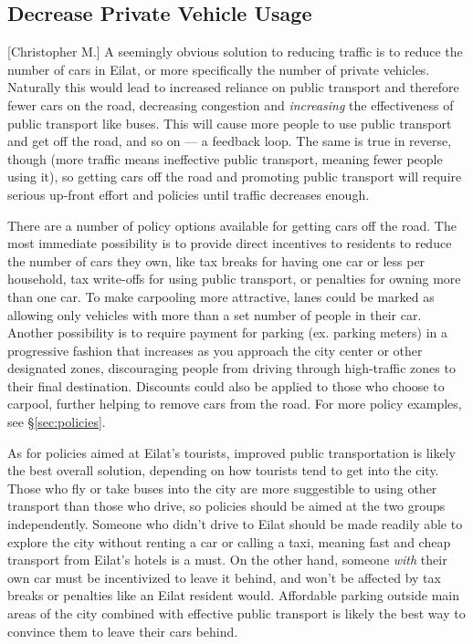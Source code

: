 \documentclass[12pt]{article}                       %
\begin{document}
\subsection{Decrease Private Vehicle Usage}[Christopher M.]
A seemingly obvious solution to reducing traffic is to reduce the number of cars in Eilat, or more specifically the number of private vehicles. Naturally this would lead to increased reliance on public transport and therefore fewer cars on the road, decreasing congestion and \textit{increasing} the effectiveness of public transport like buses. This will cause more people to use public transport and get off the road, and so on --- a feedback loop. The same is true in reverse, though (more traffic means ineffective public transport, meaning fewer people using it), so getting cars off the road and promoting public transport will require serious up-front effort and policies until traffic decreases enough.

There are a number of policy options available for getting cars off the road. The most immediate possibility is to provide direct incentives to residents to reduce the number of cars they own, like tax breaks for having one car or less per household, tax write-offs for using public transport, or penalties for owning more than one car. To make carpooling more attractive, lanes could be marked as allowing only vehicles with more than a set number of people in their car. Another possibility is to require payment for parking (ex. parking meters) in a progressive fashion that increases as you approach the city center or other designated zones, discouraging people from driving through high-traffic zones to their final destination. Discounts could also be applied to those who choose to carpool, further helping to remove cars from the road. For more policy examples, see \S\ref{sec:policies}.

As for policies aimed at Eilat's tourists, improved public transportation is likely the best overall solution, depending on how tourists tend to get into the city. Those who fly or take buses into the city are more suggestible to using other transport than those who drive, so policies should be aimed at the two groups independently. Someone who didn't drive to Eilat should be made readily able to explore the city without renting a car or calling a taxi, meaning fast and cheap transport from Eilat's hotels is a must. On the other hand, someone \textit{with} their own car must be incentivized to leave it behind, and won't be affected by tax breaks or penalties like an Eilat resident would. Affordable parking outside main areas of the city combined with effective public transport is likely the best way to convince them to leave their cars behind.
\end{document}
